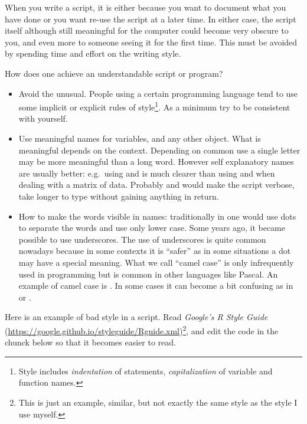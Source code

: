 \documentclass[krantz2]{krantz}\usepackage{knitr}%
\newcommand{\href}[2]{\emph{#2} (\url{#1})}
\begin{document}
When you write a script, it is either because you want to document what you have done or you want re-use the script at a later time. In either case, the script itself although still meaningful for the computer could become very obscure to you, and even more to someone seeing it for the first time. This must be avoided by spending time and effort on the writing style.

How does one achieve an understandable script or program?
\begin{itemize}
  \item Avoid the unusual. People using a certain programming language tend to use some implicit or explicit rules of style\footnote{Style includes \textit{indentation} of statements, \textit{capitalization} of variable and function names.}. As a minimum try to be consistent with yourself.
  \item Use meaningful names for variables, and any other object. What is meaningful depends on the context. Depending on common use a single letter may be more meaningful than a long word. However self explanatory names are usually better: e.g.\ using  and  is much clearer than using  and  when dealing with a matrix of data. Probably  and  would make the script verbose, take longer to type without gaining anything in return.
  \item How to make the words visible in names: traditionally in \Rlang one would use dots to separate the words and use only lower case. Some years ago, it became possible to use underscores. The use of underscores is quite common nowadays because in some contexts it is ``safer'' as in some situations a dot may have a special meaning. What we call ``camel case'' is only infrequently used in \Rlang programming but is common in other languages like Pascal. An example of camel case is . In some cases it can become a bit confusing as in  or .
\end{itemize}

\begin{playground}
Here is an example of bad style in a script. Read \href{https://google.github.io/styleguide/Rguide.xml}{Google's R Style Guide}\footnote{This is just an example, similar, but not exactly the same style as the style I use myself.}, and edit the code in the chunck below so that it becomes easier to read.

\begin{knitrout}\footnotesize
{}\color{fgcolor}\begin{kframe}
\begin{alltt}
 \hlkwb{<-}  
 \hlkwb{<-}  
 \hlkwb{<-}
     \hlopt{*}
 \hlkwb{->} 
      \hlstd{(}
\hlstd{)}
\end{alltt}
\end{kframe}
\end{knitrout}
\end{playground}
\end{document}
